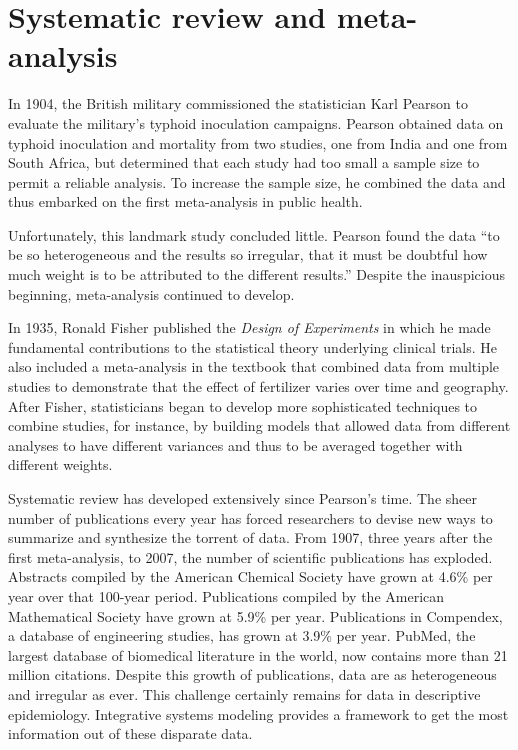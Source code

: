 \section{Systematic review and meta-analysis}
In 1904, the British military commissioned the statistician Karl
Pearson to evaluate
the military's typhoid inoculation
campaigns.\cite{Pearson_Report_1904} Pearson obtained data on typhoid
inoculation and mortality from two studies, one from India and one
from South Africa, but determined that each study had too small a
sample size to permit a reliable analysis. To increase the sample
size, he combined the data and thus embarked on the first
meta-analysis in public health.

Unfortunately, this landmark study concluded little. Pearson found the
data ``to be so heterogeneous and the results so irregular, that it
must be doubtful how much weight is to be attributed to the different
results.'' Despite the inauspicious beginning, meta-analysis continued
to develop.

In 1935, Ronald Fisher published the \emph{Design of
  Experiments} in which he made fundamental contributions to the
statistical theory underlying clinical trials. He also included a
meta-analysis in the textbook that combined data from multiple studies
to demonstrate that the effect of fertilizer varies over time and
geography. \cite{Fisher_Design_1935,O'Rourke_An_2007} After Fisher, statisticians began
to develop more sophisticated techniques to combine studies, for
instance, by building models that allowed data from different analyses to
have different variances and thus to be averaged together with
different weights.

Systematic review has developed extensively since Pearson's time. The
sheer number of publications every year has forced researchers to
devise new ways to summarize and synthesize the torrent of data. From
1907, three years after the first meta-analysis, to 2007, the number of
scientific publications has exploded. Abstracts compiled by the
American Chemical Society have grown at 4.6\% per year over that
100-year period. Publications compiled by the American Mathematical
Society have grown at 5.9\% per year.  Publications in Compendex, a
database of engineering studies, has grown at 3.9\% per year.
\cite{Larsen_Rate_2010} PubMed, the largest database of biomedical
literature in the world, now contains more than 21 million citations.
\cite{US_PubMed_2012} Despite this growth of publications, data are 
as heterogeneous and irregular as ever. This challenge certainly remains 
for data in descriptive epidemiology. Integrative systems modeling 
provides a framework to get the most information out of these disparate data.

